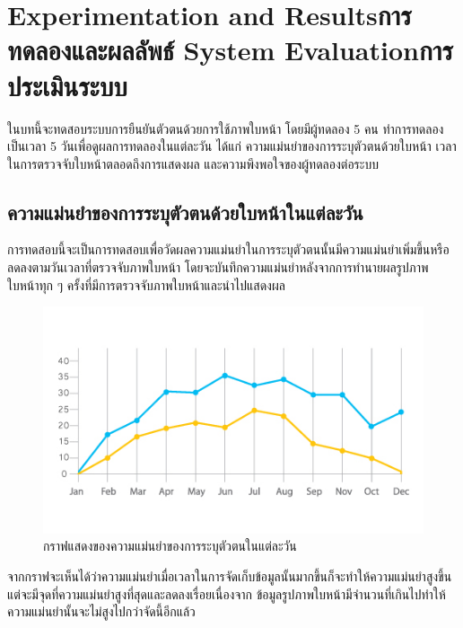 \chapter{\ifproject%
\ifenglish Experimentation and Results\else การทดลองและผลลัพธ์\fi
\else%
\ifenglish System Evaluation\else การประเมินระบบ\fi
\fi}

ในบทนี้จะทดสอบระบบการยืนยันตัวตนด้วยการใช้ภาพใบหน้า โดยมีผู้ทดลอง 5 คน 
ทำการทดลองเป็นเวลา 5 วันเพื่อดูผลการทดลองในแต่ละวัน ได้แก่ ความแม่นยำของการระบุตัวตนด้วยใบหน้า 
เวลาในการตรวจจับใบหน้าตลอดถึงการแสดงผล และความพึงพอใจของผู้ทดลองต่อระบบ

\section{ความแม่นยำของการระบุตัวตนด้วยใบหน้าในแต่ละวัน}
การทดสอบนี้จะเป็นการทดสอบเพื่อวัดผลความแม่นยำในการระบุตัวตนนั้นมีความแม่นยำเพิ่มขึ้นหรือลดลงตามวันเวลาที่ตรวจจับภาพใบหน้า
โดยจะบันทึกความแม่นยำหลังจากการทำนายผลรูปภาพใบหน้าทุก ๆ ครั้งที่มีการตรวจจับภาพใบหน้าและนำไปแสดงผล

\begin{figure}[!ht]
    \begin{center}
      \includegraphics[scale=.7]{pic/graph_acc.jpg}
      \caption[กราฟแสดงของความแม่นยำของการระบุตัวตนในแต่ละวัน]{กราฟแสดงของความแม่นยำของการระบุตัวตนในแต่ละวัน}
      \label{fig:acc_graph}
    \end{center}
  \end{figure}

\indent จากกราฟจะเห็นได้ว่าความแม่นยำเมื่อเวลาในการจัดเก็บข้อมูลนั้นมากขึ้นก็จะทำให้ความแม่นยำสูงขึ้น แต่จะมีจุดที่ความแม่นยำสูงที่สุดและลดลงเรื่อยเนื่องจาก
ข้อมูลรูปภาพใบหน้ามีจำนวนที่เกินไปทำให้ความแม่นยำนั้นจะไม่สูงไปกว่าจัดนี้อีกแล้ว

